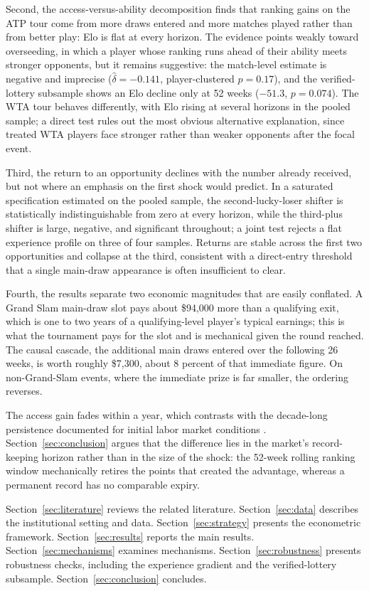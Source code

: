 Second, the access-versus-ability decomposition finds that ranking gains on the ATP tour come from more draws entered and more matches played rather than from better play: Elo is flat at every horizon. The evidence points weakly toward overseeding, in which a player whose ranking runs ahead of their ability meets stronger opponents, but it remains suggestive: the match-level estimate is negative and imprecise ($\hat\delta = -0.141$, player-clustered $p = 0.17$), and the verified-lottery subsample shows an Elo decline only at 52 weeks ($-51.3$, $p = 0.074$). The WTA tour behaves differently, with Elo rising at several horizons in the pooled sample; a direct test rules out the most obvious alternative explanation, since treated WTA players face stronger rather than weaker opponents after the focal event.

Third, the return to an opportunity declines with the number already received, but not where an emphasis on the first shock would predict. In a saturated specification estimated on the pooled sample, the second-lucky-loser shifter is statistically indistinguishable from zero at every horizon, while the third-plus shifter is large, negative, and significant throughout; a joint test rejects a flat experience profile on three of four samples. Returns are stable across the first two opportunities and collapse at the third, consistent with a direct-entry threshold that a single main-draw appearance is often insufficient to clear.

Fourth, the results separate two economic magnitudes that are easily conflated. A Grand Slam main-draw slot pays about \$94{,}000 more than a qualifying exit, which is one to two years of a qualifying-level player's typical earnings; this is what the tournament pays for the slot and is mechanical given the round reached. The causal cascade, the additional main draws entered over the following 26 weeks, is worth roughly \$7{,}300, about 8 percent of that immediate figure. On non-Grand-Slam events, where the immediate prize is far smaller, the ordering reverses.

The access gain fades within a year, which contrasts with the decade-long persistence documented for initial labor market conditions \citep{Oyer2006_initial_placement, Oreopoulos2012_graduating_recession}. Section~\ref{sec:conclusion} argues that the difference lies in the market's record-keeping horizon rather than in the size of the shock: the 52-week rolling ranking window mechanically retires the points that created the advantage, whereas a permanent record has no comparable expiry.

Section~\ref{sec:literature} reviews the related literature. Section~\ref{sec:data} describes the institutional setting and data. Section~\ref{sec:strategy} presents the econometric framework. Section~\ref{sec:results} reports the main results. Section~\ref{sec:mechanisms} examines mechanisms. Section~\ref{sec:robustness} presents robustness checks, including the experience gradient and the verified-lottery subsample. Section~\ref{sec:conclusion} concludes.
